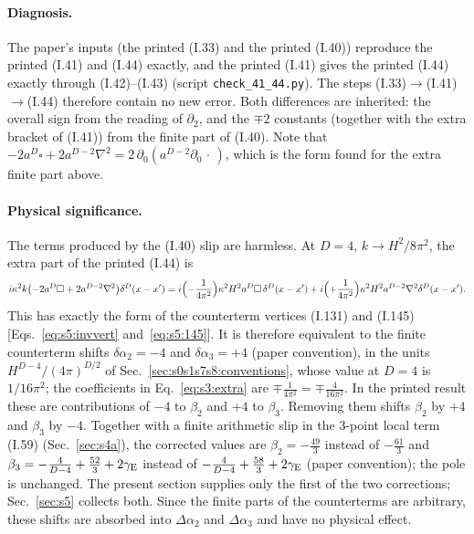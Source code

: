 \documentclass[aps,prd,onecolumn,10pt,nofootinbib,floatfix]{revtex4-2}
\newcommand{\eqI}[1]{(I.#1)}
\begin{document}
\paragraph*{Diagnosis.}
The paper's inputs (the printed \eqI{33} and the printed \eqI{40}) reproduce the printed \eqI{41}
and \eqI{44} exactly, and the printed \eqI{41} gives the printed \eqI{44} exactly through
\eqI{42}--\eqI{43} (script \mbox{\nolinkurl{check_41_44.py}}). The steps
\eqI{33}$\to$\eqI{41}$\to$\eqI{44} therefore contain no new error. Both differences are
inherited: the overall sign from the reading of $\partial_2$, and the $\mp2$ constants (together
with the extra bracket of \eqI{41}) from the finite part of \eqI{40}. Note that
$-2a^D\square+2a^{D-2}\nabla^2=2\,\partial_0(a^{D-2}\partial_0\,\cdot\,)$, which is the form found
for the extra finite part above.

\paragraph*{Physical significance.}
The terms produced by the \eqI{40} slip are harmless. At $D=4$, $k\to H^2/8\pi^2$, the extra part
of the printed \eqI{44} is
\begin{equation}\label{eq:s3:extra}
i\kappa^2k\bigl(-2a^D\square+2a^{D-2}\nabla^2\bigr)\delta^D(x-x')
=i\Bigl(-\frac1{4\pi^2}\Bigr)\kappa^2H^2a^D\square\,\delta^D(x-x')
+i\Bigl(+\frac1{4\pi^2}\Bigr)\kappa^2H^2a^{D-2}\nabla^2\delta^D(x-x') .
\end{equation}
This has exactly the form of the counterterm vertices \eqI{131} and \eqI{145}
[Eqs.~\eqref{eq:s5:invvert} and~\eqref{eq:s5:145}]. It is therefore equivalent to the finite counterterm shifts
$\delta\alpha_2=-4$ and $\delta\alpha_3=+4$ (paper convention), in the units $H^{D-4}/(4\pi)^{D/2}$ of Sec.~\ref{sec:s0s1s7s8:conventions},
whose value at $D=4$ is $1/16\pi^2$; the coefficients in Eq.~\eqref{eq:s3:extra} are $\mp\frac1{4\pi^2}=\mp\frac{4}{16\pi^2}$.
In the printed result these are contributions of $-4$ to $\beta_2$ and $+4$ to $\beta_3$.
Removing them shifts $\beta_2$ by $+4$ and $\beta_3$ by $-4$. Together with a finite arithmetic
slip in the 3-point local term \eqI{59} (Sec.~\ref{sec:s4a}), the corrected values are
$\beta_2=-\frac{49}{3}$ instead of $-\frac{61}{3}$ and
$\beta_3=-\frac4{D-4}+\frac{52}{3}+2\gamma_{\rm E}$ instead of $-\frac4{D-4}+\frac{58}{3}+2\gamma_{\rm E}$
(paper convention); the pole is unchanged. The present section supplies only the first of the two
corrections; Sec.~\ref{sec:s5} collects both. Since the finite parts of
the counterterms are arbitrary, these shifts are absorbed into $\Delta\alpha_2$ and
$\Delta\alpha_3$ and have no physical effect.
\end{document}
